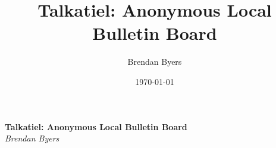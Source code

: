 \documentclass[12pt]{article}
\title{Talkatiel: Anonymous Local Bulletin Board}
\author{Brendan Byers}
\date{\today}
\begin{document}
\begin{center}
      \Large\textbf{Talkatiel: Anonymous Local Bulletin Board}\\
      \large\textit{Brendan Byers}
   \end{center}
\end{document}
